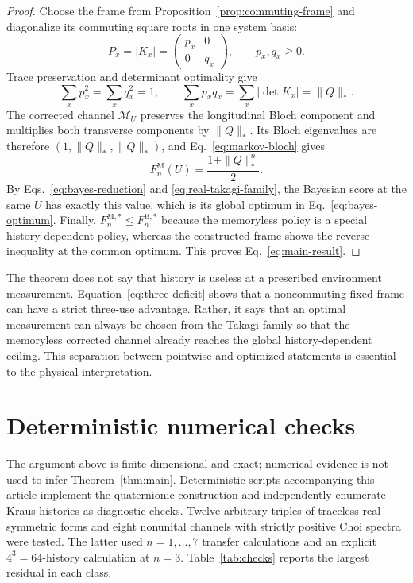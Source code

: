 \documentclass[11pt]{article}
\theoremstyle{remark}
\newcommand{\cM}{\mathcal{M}}
\begin{document}
\begin{proof}
Choose the frame from Proposition~\ref{prop:commuting-frame} and diagonalize
its commuting square roots in one system basis:
\begin{equation}
 P_x=|K_x|=\begin{pmatrix}p_x&0\\0&q_x\end{pmatrix},
 \qquad p_x,q_x\geq0 .
\end{equation}
Trace preservation and determinant optimality give
\begin{equation}
 \sum_xp_x^2=\sum_xq_x^2=1,
 \qquad \sum_xp_xq_x=\sum_x|\det K_x|=\|Q\|_* .
 \label{eq:diagonal-sums}
\end{equation}
The corrected channel $\cM_U$ preserves the longitudinal Bloch component and
multiplies both transverse components by $\|Q\|_*$.  Its Bloch eigenvalues are
therefore $(1,\|Q\|_*,\|Q\|_*)$, and Eq.~\eqref{eq:markov-bloch} gives
\begin{equation}
 F^{\mathrm M}_n(U)=\frac{1+\|Q\|_*^n}{2}.
\end{equation}
By Eqs.~\eqref{eq:bayes-reduction} and
\eqref{eq:real-takagi-family}, the Bayesian score at the same $U$ has exactly
this value, which is its global optimum in Eq.~\eqref{eq:bayes-optimum}.
Finally, $F^{\mathrm M,*}_n\leq F^{\mathrm B,*}_n$ because the memoryless
policy is a special history-dependent policy, whereas the constructed frame
shows the reverse inequality at the common optimum.  This proves
Eq.~\eqref{eq:main-result}.
\end{proof}

The theorem does not say that history is useless at a prescribed environment
measurement.  Equation~\eqref{eq:three-deficit} shows that a noncommuting
fixed frame can have a strict three-use advantage.  Rather, it says that an
optimal measurement can always be chosen from the Takagi family so that the
memoryless corrected channel already reaches the global history-dependent
ceiling.  This separation between pointwise and optimized statements is
essential to the physical interpretation.

\section{Deterministic numerical checks}
\label{sec:checks}

The argument above is finite dimensional and exact; numerical evidence is not
used to infer Theorem~\ref{thm:main}.  Deterministic scripts accompanying this
article implement the quaternionic construction and independently enumerate
Kraus histories as diagnostic checks.  Twelve arbitrary triples of traceless
real symmetric forms and eight nonunital channels with strictly positive Choi
spectra were tested.  The latter used $n=1,\ldots,7$ transfer calculations and
an explicit $4^3=64$-history calculation at $n=3$.  Table~\ref{tab:checks}
reports the largest residual in each class.
\end{document}

